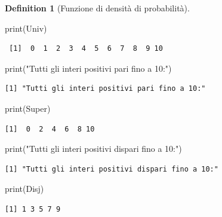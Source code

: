 \documentclass[
  letterpaper,
  DIV=11,
  numbers=noendperiod,
  oneside]{scrreprt}
\newenvironment{Shaded}{\begin{snugshade}}{\end{snugshade}}
\newcommand{\FunctionTok}[1]{\textcolor[rgb]{0.28,0.35,0.67}{#1}}
\newcommand{\NormalTok}[1]{\textcolor[rgb]{0.00,0.23,0.31}{#1}}
\newcommand{\StringTok}[1]{\textcolor[rgb]{0.13,0.47,0.30}{#1}}
\theoremstyle{definition}
\theoremstyle{plain}
\theoremstyle{definition}
\newtheorem{definition}{Definition}[chapter]
\theoremstyle{remark}
\begin{document}
\begin{definition}[Funzione di densità di
probabilità]
\begin{Shaded}
\begin{Highlighting}[]
\FunctionTok{print}\NormalTok{(Univ)}
\end{Highlighting}
\end{Shaded}

\begin{verbatim}
 [1]  0  1  2  3  4  5  6  7  8  9 10
\end{verbatim}

\begin{Shaded}
\begin{Highlighting}[]
\FunctionTok{print}\NormalTok{(}\StringTok{"Tutti gli interi positivi pari fino a 10:"}\NormalTok{)}
\end{Highlighting}
\end{Shaded}

\begin{verbatim}
[1] "Tutti gli interi positivi pari fino a 10:"
\end{verbatim}

\begin{Shaded}
\begin{Highlighting}[]
\FunctionTok{print}\NormalTok{(Super)}
\end{Highlighting}
\end{Shaded}

\begin{verbatim}
[1]  0  2  4  6  8 10
\end{verbatim}

\begin{Shaded}
\begin{Highlighting}[]
\FunctionTok{print}\NormalTok{(}\StringTok{"Tutti gli interi positivi dispari fino a 10:"}\NormalTok{)}
\end{Highlighting}
\end{Shaded}

\begin{verbatim}
[1] "Tutti gli interi positivi dispari fino a 10:"
\end{verbatim}

\begin{Shaded}
\begin{Highlighting}[]
\FunctionTok{print}\NormalTok{(Disj)}
\end{Highlighting}
\end{Shaded}

\begin{verbatim}
[1] 1 3 5 7 9
\end{verbatim}


\end{definition}
\end{document}
